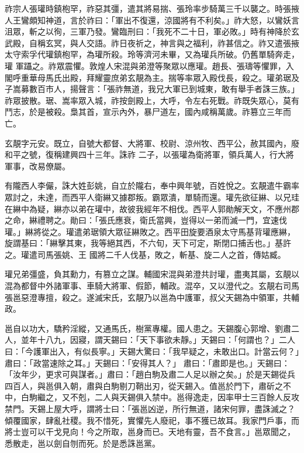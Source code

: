 \begin{pinyinscope}
 祚宗人張瓘時鎮枹罕，祚惡其彊，遣其將易揣、張玲率步騎萬三千以襲之。時張掖人王鸞頗知神道，言於祚曰：「軍出不復還，涼國將有不利矣。」祚大怒，以鸞妖言沮眾，斬之以徇，三軍乃發。鸞臨刑曰：「我死不二十日，軍必敗。」時有神降於玄武殿，自稱玄冥，與人交語。祚日夜祈之，神言與之福利，祚甚信之。祚又遣張掖太守索孚代瓘鎮枹罕，為瓘所殺。玲等濟河未畢，又為瓘兵所破。仍舊單騎奔走，瓘
 軍躡之。祚眾震懼。敦煌人宋混與弟澄等聚眾以應瓘。趙長、張璹等懼罪，入閣呼重華母馬氏出殿，拜耀靈庶弟玄靚為主。揣等率眾入殿伐長，殺之。瓘弟琚及子嵩募數百市人，揚聲言：「張祚無道，我兄大軍已到城東，敢有舉手者誅三族。」祚眾披散。琚、嵩率眾入城，祚按劍殿上，大呼，令左右死戰。祚既失眾心，莫有鬥志，於是被殺。梟其首，宣示內外，暴尸道左，國內咸稱萬歲。祚篡立三年而亡。



 玄靚字元安。既立，自號大都督、大將軍、校尉、涼州牧、西平公，赦其國內，廢和平之號，復稱建興四十三年。誅祚
 二子，以張瓘為衛將軍，領兵萬人，行大將軍事，改易僚屬。



 有隴西人李儼，誅大姓彭姚，自立於隴右，奉中興年號，百姓悅之。玄靚遣牛霸率眾討之，未達，而西平人衛綝又據郡叛。霸眾潰，單騎而還。瓘先欲征綝、以兄珪在綝中為疑，綝亦以弟在瓘中，故彼我經年不相伐。西平人郭勛解天文，不應州郡之命，綝禮聘之。勛曰：「張氏應衰，衛氏當興，豈得以一弟而滅一門，宜速伐瓘。」綝將從之。瓘遣弟琚領大眾征綝敗之。西平田旋要酒泉太守馬基背瓘應綝，旋謂基曰：「綝擊其東，我等絕其西，不六旬，天下可定，斯閉口捕舌也。」基許之。瓘遣司馬張姚、王
 國將二千人伐基，敗之，斬基、旋二人之首，傳姑臧。



 瓘兄弟彊盛，負其勳力，有篡立之謀。輔國宋混與弟澄共討瓘，盡夷其屬，玄靚以混為都督中外諸軍事、車騎大將軍、假節，輔政。混卒，又以澄代之。玄靚右司馬張邕惡澄專擅，殺之。遂滅宋氏，玄靚乃以邕為中護軍，叔父天錫為中領軍，共輔政。



 邕自以功大，驕矜淫縱，又通馬氏，樹黨專權。國人患之。天錫腹心郭增、劉肅二人，並年十八九，因寢，謂天錫曰：「天下事欲未靜。」天錫曰：「何謂也？」二人曰：「今護軍出入，有似長寧。」天錫大驚曰：「我早疑之，未敢出口。計當云何？」肅曰：「政當速除之耳。」天錫曰：「安得其人？」
 肅曰：「肅即是也。」天錫曰：「汝年少，更求可與謀者。」肅曰：「趙白駒及肅二人足以辦之矣。」於是天錫從兵四百人，與邕俱入朝，肅與白駒剔刀鞘出刃，從天錫入。值邕於門下，肅斫之不中，白駒繼之，又不剋，二人與天錫俱入禁中。邕得逸走，因率甲士三百餘人反攻禁門。天錫上屋大呼，謂將士曰：「張邕凶逆，所行無道，諸宋何罪，盡誅滅之？傾覆國家，肆亂社稷。我不惜死，實懼先人廢祀，事不獲已故耳。我家門戶事，而將士豈可以干戈見向！今之所取，邕身而已。天地有靈，吾不食言。」邕眾聞之，悉散走，邕以劍自刎而死。於是悉誅邕黨。




\end{pinyinscope}
